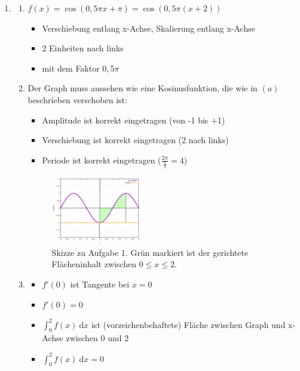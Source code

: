 \documentclass[12pt]{article}
\providecommand\d{}
\renewcommand{\d}[1]{\:\mathrm{d}{#1}}
\begin{document}
\begin{enumerate}

\item
\begin{enumerate}
\item $f(x) = \cos(0,5\pi x+\pi) = \cos(0,5\pi(x+2))$
\begin{itemize}
\item Verschiebung entlang x-Achse, Skalierung entlang x-Achse
\item 2 Einheiten nach links
\item mit dem Faktor $0,5\pi$
\end{itemize}

\item Der Graph muss aussehen wie eine Kosinusfunktion, die wie in $(a)$ beschrieben verschoben ist:
\begin{itemize}
\item Amplitude ist korrekt eingetragen (von -1 bis +1)
\item Verschiebung ist korrekt eingetragen (2 nach links)
\item Periode ist korrekt eingetragen ($\frac{2\pi}{\frac{\pi}{2}} = 4$)
\end{itemize}

\begin{figure}[ht]
	\centering
	\includegraphics[width=0.4\textwidth]{grid_klausur_lsg.png}
	\caption{Skizze zu Aufgabe 1. Grün markiert ist der gerichtete Flächeninhalt zwischen $0\le x \le 2$.}
	\label{fig1}
\end{figure}


\item 
\begin{itemize}
\item $f'(0)$ ist Tangente bei $x=0$
\item $f'(0) = 0$
\item $\int_0^2 f(x) \d x$ ist (vorzeichenbehaftete) Fläche zwischen Graph und x-Achse zwischen 0 und 2
\item $\int_0^2 f(x) \d x = 0$
\end{itemize}


\end{enumerate}
\end{enumerate}
\end{document}
